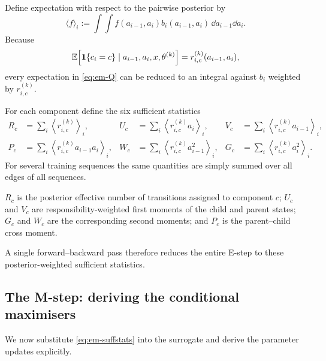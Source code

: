 Define expectation with respect to the pairwise posterior by
\begin{equation}
  \langle f\rangle_i
  :=
  \int\!\!\int
  f(a_{i-1},a_i)
  b_i(a_{i-1},a_i)
  \,\dd a_{i-1}\dd a_i.
  \label{eq:em-bracket}
\end{equation}
Because
\begin{equation}
  \mathbb{E}\!\left[
    \mathbf 1\{c_i=c\}
    \mid a_{i-1},a_i,x,\theta^{(k)}
  \right]
  =
  r_{i,c}^{(k)}(a_{i-1},a_i),
  \label{eq:em-indicator-responsibility}
\end{equation}
every expectation in \eqref{eq:em-Q} can be reduced to an integral against
$b_i$ weighted by $r_{i,c}^{(k)}$.

For each component define the six sufficient statistics
\begin{equation}
  \begin{aligned}
    R_c
    &=
    \sum_i
    \left\langle r_{i,c}^{(k)}\right\rangle_i,
    &
    U_c
    &=
    \sum_i
    \left\langle
      r_{i,c}^{(k)}a_i
    \right\rangle_i,
    &
    V_c
    &=
    \sum_i
    \left\langle
      r_{i,c}^{(k)}a_{i-1}
    \right\rangle_i,
    \\[1mm]
    P_c
    &=
    \sum_i
    \left\langle
      r_{i,c}^{(k)}a_{i-1}a_i
    \right\rangle_i,
    &
    W_c
    &=
    \sum_i
    \left\langle
      r_{i,c}^{(k)}a_{i-1}^2
    \right\rangle_i,
    &
    G_c
    &=
    \sum_i
    \left\langle
      r_{i,c}^{(k)}a_i^2
    \right\rangle_i.
  \end{aligned}
  \label{eq:em-suffstats}
\end{equation}
For several training sequences the same quantities are simply summed over
all edges of all sequences.

 $R_c$ is the posterior effective
number of transitions assigned to component $c$; $U_c$ and $V_c$ are
responsibility-weighted first moments of the child and parent states;
$G_c$ and $W_c$ are the corresponding second moments; and $P_c$ is the
parent--child cross moment.

A single forward--backward pass therefore reduces the entire E-step to these
posterior-weighted sufficient statistics.

\subsection{The M-step: deriving the conditional maximisers}

We now substitute \eqref{eq:em-suffstats} into the surrogate and derive the
parameter updates explicitly.

